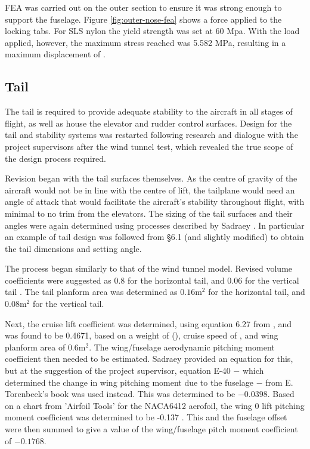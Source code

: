 \documentclass[../../main.tex]{subfiles}
\begin{document}

FEA was carried out on the outer section to ensure it was strong enough to support the fuselage.
Figure \ref{fig:outer-nose-fea} shows a  force applied to the locking tabs.
For SLS nylon the yield strength was set at 60 Mpa.
With the  load applied, however, the maximum stress reached was 5.582 MPa, resulting in a maximum displacement of . 

\subsection{Tail} \label{sec:design-process:revised-design:tail}

The tail is required to provide adequate stability to the aircraft in all stages of flight, as well as house the elevator and rudder control surfaces.
Design for the tail and stability systems was restarted following research and dialogue with the project supervisors after the wind tunnel test, which revealed the true scope of the design process required. 

Revision began with the tail surfaces themselves.
As the centre of gravity of the aircraft would not be in line with the centre of lift, the tailplane would need an angle of attack that would facilitate the aircraft's stability throughout flight, with minimal to no trim from the elevators.
The sizing of the tail surfaces and their angles were again determined using processes described by Sadraey \cite{sadraey-13}.
In particular an example of tail design was followed from \S 6.1 (and slightly modified) to obtain the tail dimensions and setting angle. 

The process began similarly to that of the wind tunnel model.
Revised volume coefficients were suggested as 0.8 for the horizontal tail, and 0.06 for the vertical tail \cite{towell-19}.
The tail planform area was determined as $0.16 \mathrm{m^2}$ for the horizontal tail, and $0.08 \mathrm{m^2}$ for the vertical tail.  %

Next, the cruise lift coefficient was determined, using equation 6.27 from \cite{sadraey-13}, and was found to be 0.4671, based on a weight of  (), cruise speed of , and wing planform area of $0.6 \mathrm{m^2}$.
The wing/fuselage aerodynamic pitching moment coefficient then needed to be estimated.
Sadraey provided an equation for this, but at the suggestion of the project supervisor, equation E-40 $-$ which determined the change in wing pitching moment due to the fuselage $-$ from E. Torenbeek’s book \cite{torenbeek-76} was used instead.
This was determined to be $-0.0398$.
Based on a chart from 'Airfoil Tools' for the NACA6412 aerofoil, the wing 0 lift pitching moment coefficient was determined to be -0.137 \cite{airfoil-tools-19}.
This and the fuselage offset were then summed to give a value of the wing/fuselage pitch moment coefficient of $-0.1768.$ 
\end{document}
